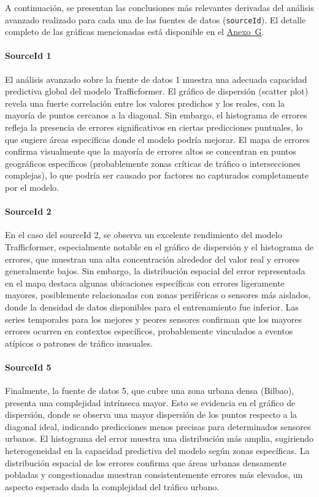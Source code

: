 A continuación, se presentan las conclusiones más relevantes derivadas del análisis avanzado realizado para cada una de las fuentes de datos (\texttt{sourceId}). El detalle completo de las gráficas mencionadas está disponible en el \hyperref[anexo:analisis_avanzado]{Anexo~G}.

\paragraph{SourceId 1}
El análisis avanzado sobre la fuente de datos 1 muestra una adecuada capacidad predictiva global del modelo Trafficformer. El gráfico de dispersión (scatter plot) revela una fuerte correlación entre los valores predichos y los reales, con la mayoría de puntos cercanos a la diagonal. Sin embargo, el histograma de errores refleja la presencia de errores significativos en ciertas predicciones puntuales, lo que sugiere áreas específicas donde el modelo podría mejorar. El mapa de errores confirma visualmente que la mayoría de errores altos se concentran en puntos geográficos específicos (probablemente zonas críticas de tráfico o intersecciones complejas), lo que podría ser causado por factores no capturados completamente por el modelo.

\paragraph{SourceId 2}
En el caso del sourceId 2, se observa un excelente rendimiento del modelo Trafficformer, especialmente notable en el gráfico de dispersión y el histograma de errores, que muestran una alta concentración alrededor del valor real y errores generalmente bajos. Sin embargo, la distribución espacial del error representada en el mapa destaca algunas ubicaciones específicas con errores ligeramente mayores, posiblemente relacionadas con zonas periféricas o sensores más aislados, donde la densidad de datos disponibles para el entrenamiento fue inferior. Las series temporales para los mejores y peores sensores confirman que los mayores errores ocurren en contextos específicos, probablemente vinculados a eventos atípicos o patrones de tráfico inusuales.

\paragraph{SourceId 5}
Finalmente, la fuente de datos 5, que cubre una zona urbana densa (Bilbao), presenta una complejidad intrínseca mayor. Esto se evidencia en el gráfico de dispersión, donde se observa una mayor dispersión de los puntos respecto a la diagonal ideal, indicando predicciones menos precisas para determinados sensores urbanos. El histograma del error muestra una distribución más amplia, sugiriendo heterogeneidad en la capacidad predictiva del modelo según zonas específicas. La distribución espacial de los errores confirma que áreas urbanas densamente pobladas y congestionadas muestran consistentemente errores más elevados, un aspecto esperado dada la complejidad del tráfico urbano.

